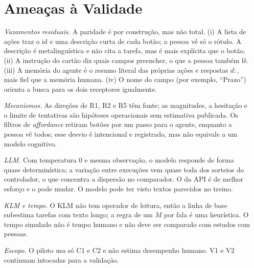\section{Ameaças à Validade}
\emph{Vazamentos residuais.} A paridade é por construção, mas não total. (i) A lista de ações traz o id e uma descrição curta de cada botão; a pessoa vê só o rótulo. A descrição é metalinguística e não cita a tarefa, mas é mais explícita que o botão. (ii) A instrução do cartão diz quais campos preencher, o que a pessoa também lê. (iii) A memória do agente é o resumo literal das próprias ações e respostas $d{:}$, mais fiel que a memória humana. (iv) O nome do campo (por exemplo, ``Prazo'') orienta a busca para os dois receptores igualmente.

\emph{Mecanismos.} As direções de R1, R2 e R5 têm fonte; as magnitudes, a hesitação e o limite de tentativas são hipóteses operacionais sem estimativa publicada. Os filtros de \emph{affordance} retiram botões por um passo para o agente, enquanto a pessoa vê todos; esse desvio é intencional e registrado, mas não equivale a um modelo cognitivo.

\emph{LLM.} Com temperatura 0 e mesma observação, o modelo responde de forma quase determinística; a variação entre execuções vem quase toda dos sorteios do controlador, o que concentra a dispersão no comparador. O  da API é de melhor esforço e o  pode mudar. O modelo pode ter visto textos parecidos no treino.

\emph{KLM e tempo.} O KLM não tem operador de leitura, então a linha de base subestima tarefas com texto longo; a regra de um $M$ por fala é uma heurística. O tempo simulado não é tempo humano e não deve ser comparado com estudos com pessoas.

\emph{Escopo.} O piloto usa só C1 e C2 e não estima desempenho humano. V1 e V2 continuam intocadas para a validação.
